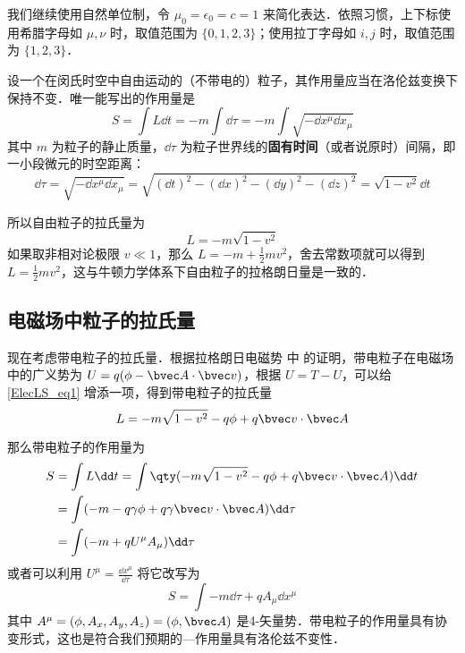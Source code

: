 
我们继续使用自然单位制，令 $\mu_0=\epsilon_0=c=1$ 来简化表达．依照习惯，上下标使用希腊字母如 $\mu, \nu$ 时，取值范围为 $\{0, 1, 2, 3\}$；使用拉丁字母如 $i, j$ 时，取值范围为 $\{1, 2, 3\}$．

设一个在闵氏时空中自由运动的（不带电的）粒子，其作用量应当在洛伦兹变换下保持不变．唯一能写出的作用量是
\begin{equation}
S=\int L\dd t=-m\int \dd \tau=-m\int \sqrt{-\dd x^\mu \dd x_\mu}
\end{equation}
其中 $m$ 为粒子的静止质量，$\dd \tau$ 为粒子世界线的\textbf{固有时间}（或者说原时）间隔，即一小段微元的时空距离：
\begin{equation}
\dd \tau=\sqrt{-\dd x^\mu\dd x_\mu}=\sqrt{(\dd t)^2-(\dd x)^2-(\dd y)^2-(\dd z)^2}=\sqrt{1-v^2}\dd t
\end{equation}

所以自由粒子的拉氏量为
\begin{equation}\label{ElecLS_eq1}
L=-m\sqrt{1-v^2}
\end{equation}
如果取非相对论极限 $v\ll 1$，那么 $L=-m+\frac{1}{2}mv^2$，舍去常数项就可以得到 $L=\frac{1}{2}mv^2$，这与牛顿力学体系下自由粒子的拉格朗日量是一致的．
\subsection{电磁场中粒子的拉氏量}
现在考虑带电粒子的拉氏量．根据拉格朗日电磁势 中  的证明，带电粒子在电磁场中的广义势为 $U=q(\phi-\bvec A\cdot \bvec v)$，根据 $U=T-U$，可以给\autoref{ElecLS_eq1} 增添一项，得到带电粒子的拉氏量
\begin{equation}\label{ElecLS_eq2}
L=-m\sqrt{1-v^2}-q\phi+q\bvec v\cdot \bvec A
\end{equation}

那么带电粒子的作用量为
\begin{equation}
\begin{aligned}
S&=\int L\dd t=\int \qty(-m\sqrt{1-v^2}-q\phi +q\bvec v\cdot \bvec A)\dd t\\
&=\int (-m-q\gamma\phi+q\gamma\bvec v\cdot \bvec A)\dd \tau\\
&=\int (-m+qU^\mu A_\mu)\dd \tau
\end{aligned}
\end{equation}
或者可以利用 $U^\mu= \frac{\dd x^\mu}{\dd \tau}$ 将它改写为
\begin{equation}
S=\int -m\dd \tau+qA_\mu \dd x^\mu
\end{equation}
其中 $A^\mu=(\phi,A_x,A_y,A_z)=(\phi,\bvec A)$ 是4-矢量势．带电粒子的作用量具有协变形式，这也是符合我们预期的—作用量具有洛伦兹不变性．

